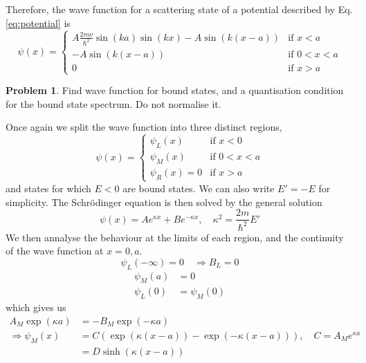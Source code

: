 \documentclass{article}
\theoremstyle{definition}
\newtheorem{definition}{Problem}[section]
\theoremstyle{remark}
\begin{document}
Therefore, the wave function for a scattering state of a potential described by Eq. \ref{eq:potential} is
\begin{equation}
    \label{eq:wave function of scattering state}
    \psi(x) = \begin{cases}
        A\frac{2m\nu}{\hbar^2}\sin(ka)\sin(kx) - A\sin(k(x-a)) & \text{if } x < a\\
        -A\sin(k(x-a)) & \text{if } 0 < x < a\\
        0 & \text{if } x > a
    \end{cases}
\end{equation}
\begin{definition}
    Find wave function for bound states, and a quantisation condition for the bound state spectrum. Do not normalise it.
\end{definition}
Once again we split the wave function into three distinct regions,
\begin{equation}
    \label{eq:wave function bound}
    \psi(x) = \begin{cases}
        \psi_L(x) & \text{if } x < 0\\
        \psi_M(x) & \text{if } 0 < x < a\\
        \psi_R(x) = 0 & \text{if } x > a
    \end{cases}
\end{equation}
and states for which $E<0$ are bound states. We can also write $E' = -E$ for simplicity. The Schr\"odinger equation is then solved by the general solution
\begin{equation}
    \label{eq:general solution bound}
    \psi(x) = Ae^{\kappa x} + Be^{-\kappa x}, \quad \kappa^2 = \frac{2m}{\hbar^2}E'
\end{equation}
We then annalyse the behaviour at the limits of each region, and the continuity of the wave function at $x=0, a$.
\begin{equation*}
    \psi_L(-\infty) = 0 \quad\Rightarrow B_L = 0
\end{equation*}
\begin{align*}
    \psi_M(a) &= 0\\
    \psi_L(0) &= \psi_M(0)
\end{align*}
which gives us
\begin{align*}
    A_M\exp(\kappa a) &= - B_M\exp(-\kappa a)\\
    \Rightarrow \psi_M(x) &= C(\exp(\kappa(x-a))-\exp(-\kappa(x-a))),\quad C = A_Me^{\kappa a}\\
    &= D\sinh(\kappa(x-a))
\end{align*}
\end{document}
